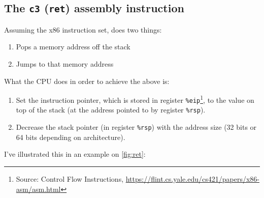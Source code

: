 \subsection{The \texttt{c3} (\texttt{ret}) assembly instruction}

Assuming the x86 instruction set,  does two things:

\begin{enumerate}
  \item Pops a memory address off the stack
  \item Jumps to that memory address
\end{enumerate}

What the CPU does in order to achieve the above is:

\begin{enumerate}
  \item Set the instruction pointer, which is stored in register \texttt{\%eip}\footnote{Source: Control Flow Instructions, \url{https://flint.cs.yale.edu/cs421/papers/x86-asm/asm.html}}, to the value on top of the stack (at the address pointed to by register \texttt{\%rsp}).
  \item Decrease the stack pointer (in register \texttt{\%rsp}) with the address size (32 bits or 64 bits depending on architecture).
\end{enumerate}

I've illustrated this in an example on \autoref{fig:ret}:

